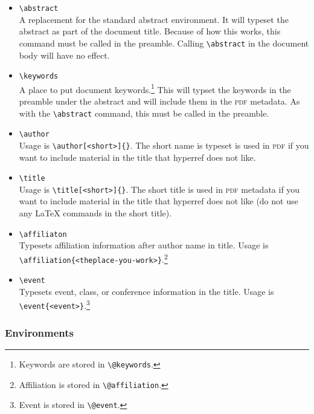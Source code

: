 \documentclass[11pt, tipa, color]{./lingdoc}
\newcommand{\Command}[1]{\texttt{\textbackslash{}#1}}
\newcommand{\Package}[1]{\textsf{{#1}}}
\begin{document}
      \begin{itemize}[leftmargin=0em]
	\item \Command{abstract} \\ 
	  A replacement for the standard abstract environment. It will typeset the abstract as part of the document title. Because of how this works, this command must be called in the preamble. Calling \Command{abstract} in the document body will have no effect.
	  
	\item \Command{keywords} \\ 
	  A place to put document keywords.\footnote{Keywords are stored in \Command{@keywords}.} This will typset the keywords in the preamble under the abstract and will include them in the \textsc{pdf} metadata. As with the \Command{abstract} command, this must be called in the preamble.

	\item \Command{author} \\
	  Usage is \Command{author[<short>]\{<full name>\}}. The short name is typeset is used in \textsc{pdf} if you want to include material in the title that \Package{hyperref} does not like.
      
	\item \Command{title} \\
	  Usage is \Command{title[<short>]\{<full title>\}}. The short title is used in \textsc{pdf} metadata if you want to include material in the title that \Package{hyperref} does not like (do not use any \LaTeX{} commands in the short title).
		
        \item \Command{affiliaton} \\
	  Typesets affiliation information after author name in title. Usage is \Command{affiliation\{<the\-place-you-work>\}}.\footnote{Affiliation is stored in \Command{@affiliation}.}
        
        \item \Command{event} \\
	  Typesets event, class, or conference information in the title. Usage is \Command{event\{<event>\}}.\footnote{Event is stored in \Command{@event}.}
	  
      \end{itemize}
      
  \subsubsection{Environments}
  
\end{document}
